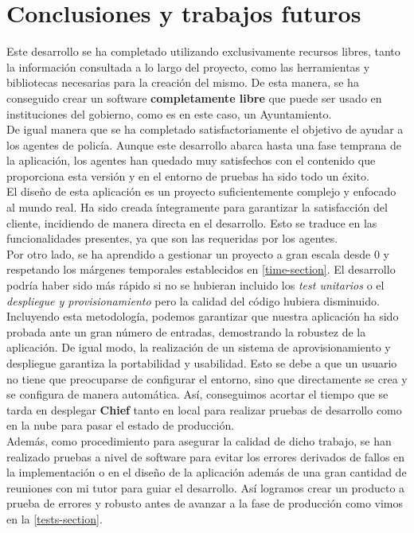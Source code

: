 \chapter{Conclusiones y trabajos futuros}

Este desarrollo se ha completado utilizando exclusivamente recursos libres, tanto la información consultada a lo largo del proyecto, como 
las herramientas y bibliotecas necesarias para la creación del mismo. De esta manera, se ha conseguido crear un software \textbf{completamente libre} que puede
ser usado en instituciones del gobierno, como es en este caso, un Ayuntamiento. \\

De igual manera que se ha completado satisfactoriamente el objetivo de ayudar a los agentes de policía. Aunque este desarrollo abarca hasta 
una fase temprana de la aplicación, los agentes han quedado muy satisfechos con el contenido que proporciona esta versión y en el entorno de pruebas ha sido todo un éxito.\\

El diseño de esta aplicación es un proyecto suficientemente complejo y enfocado al mundo real. Ha sido creada íntegramente para garantizar la satisfacción del cliente, incidiendo de manera directa en el desarrollo. Esto se traduce en las funcionalidades presentes, ya que son las requeridas por los agentes.\\

Por otro lado, se ha aprendido a gestionar un proyecto a gran escala desde 0 y respetando los márgenes temporales establecidos en \autoref{time-section}. El desarrollo podría haber sido más rápido si no se hubieran 
incluido los \textit{test unitarios} o el \textit{despliegue y provisionamiento} pero la calidad del código hubiera disminuido. Incluyendo
esta metodología, podemos garantizar que nuestra aplicación ha sido probada ante un gran número de entradas, demostrando la robustez de la aplicación. 
De igual modo, la realización de un sistema de aprovisionamiento y despliegue garantiza la portabilidad y usabilidad. Esto se debe a que
un usuario no tiene que preocuparse de configurar el entorno, sino que directamente se crea y se configura de manera automática. Así, conseguimos
acortar el tiempo que se tarda en desplegar \textbf{Chief} tanto en local para realizar pruebas de desarrollo como en la nube para pasar el estado de
producción.\\

Además, como procedimiento para asegurar la calidad de dicho trabajo, se han realizado pruebas a nivel de software para evitar los errores derivados de fallos en la implementación o en el diseño de la aplicación además de una gran cantidad de reuniones con mi tutor para guiar el desarrollo. Así logramos crear un producto a prueba de errores y robusto antes de avanzar a la fase de producción como vimos en la \autoref{tests-section}.\\

